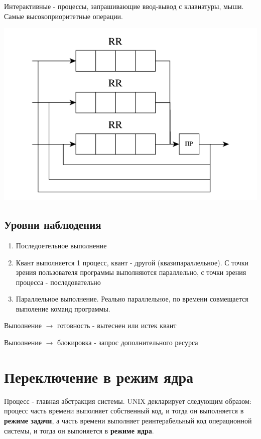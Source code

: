 \documentclass[a4paper, 14pt]{report}
\begin{document}
Интерактивные - процессы, запрашивающие ввод-вывод с клавиатуры, мыши. Самые высокоприоритетные операции.

\includegraphics[scale=0.4]{os7}

\subsection{Уровни наблюдения}

\begin{enumerate}
    \item Последоетельное выполнение
    \item Квант выполняется 1 процесс, квант - другой (квазипараллельное). С точки зрения пользователя программы выполняются параллельно, с точки зрения процесса - последовательно
    \item Параллельное выполнение. Реально параллельное, по времени совмещается выполение команд программы.
\end{enumerate}

Выполнение $\to$ готовность - вытеснен или истек квант

Выполнение $\to$ блокировка - запрос дополнительного ресурса

\section{Переключение в режим ядра}

Процесс - главная абстракция системы. UNIX декларирует следующим образом: процесс часть времени выполняет собственный код, и тогда он выполняется в \textbf{режиме задачи}, а часть времени выполняет реинтерабельный код операционной системы, и тогда он выпоняется в \textbf{режиме ядра}.
\end{document}

